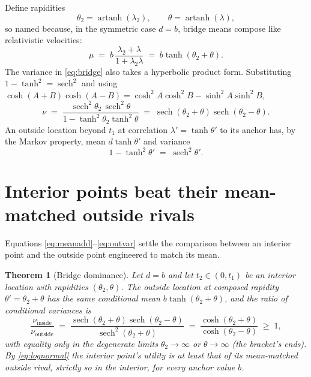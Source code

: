 \documentclass[11pt]{article}
\theoremstyle{itheads}
\newtheorem{theorem}{Theorem}
\newcommand{\sech}{\operatorname{sech}}
\newcommand{\artanh}{\operatorname{artanh}}
\begin{document}
Define rapidities
\begin{equation}
\theta_2 = \artanh(\lambda_2), \qquad \theta = \artanh(\lambda),
\end{equation}
so named because, in the symmetric case $d=b$, bridge means compose like
relativistic velocities:
\begin{equation}\label{eq:meanadd}
\mu \;=\; b\,\frac{\lambda_2+\lambda}{1+\lambda_2\lambda}
\;=\; b\tanh\!\left(\theta_2+\theta\right).
\end{equation}
The variance in \eqref{eq:bridge} also takes a hyperbolic product form.
Substituting $1-\tanh^{2}=\sech^{2}$ and using
$\cosh(A+B)\cosh(A-B)=\cosh^{2}\!A\cosh^{2}\!B-\sinh^{2}\!A\sinh^{2}\!B$,
\begin{equation}\label{eq:varprod}
\nu \;=\; \frac{\sech^{2}\theta_2\,\sech^{2}\theta}
{1-\tanh^{2}\theta_2\tanh^{2}\theta}
\;=\; \sech\!\left(\theta_2+\theta\right)\sech\!\left(\theta_2-\theta\right).
\end{equation}
An outside location beyond $t_1$ at correlation
$\lambda'=\tanh\theta'$ to its anchor has, by the Markov property, mean
$d\tanh\theta'$ and variance
\begin{equation}\label{eq:outvar}
1-\tanh^{2}\theta' \;=\; \sech^{2}\theta' .
\end{equation}

\section{Interior points beat their mean-matched outside rivals}

Equations \eqref{eq:meanadd}--\eqref{eq:outvar} settle the comparison
between an interior point and the outside point engineered to match its
mean.

\begin{theorem}[Bridge dominance]\label{thm:dominance}
Let $d=b$ and let $t_2\in(0,t_1)$ be an interior location with
rapidities $(\theta_2,\theta)$. The outside location at composed
rapidity $\theta'=\theta_2+\theta$ has the same conditional mean
$b\tanh(\theta_2+\theta)$, and the ratio of conditional variances is
\begin{equation}
\frac{\nu_{\mathrm{inside}}}{\nu_{\mathrm{outside}}}
\;=\; \frac{\sech(\theta_2+\theta)\sech(\theta_2-\theta)}
{\sech^{2}(\theta_2+\theta)}
\;=\; \frac{\cosh(\theta_2+\theta)}{\cosh(\theta_2-\theta)} \;\ge\; 1,
\end{equation}
with equality only in the degenerate limits $\theta_2\to\infty$ or
$\theta\to\infty$ (the bracket's ends). By \eqref{eq:lognormal} the
interior point's utility is at least that of its mean-matched outside
rival, strictly so in the interior, for every anchor value $b$.
\end{theorem}
\end{document}
